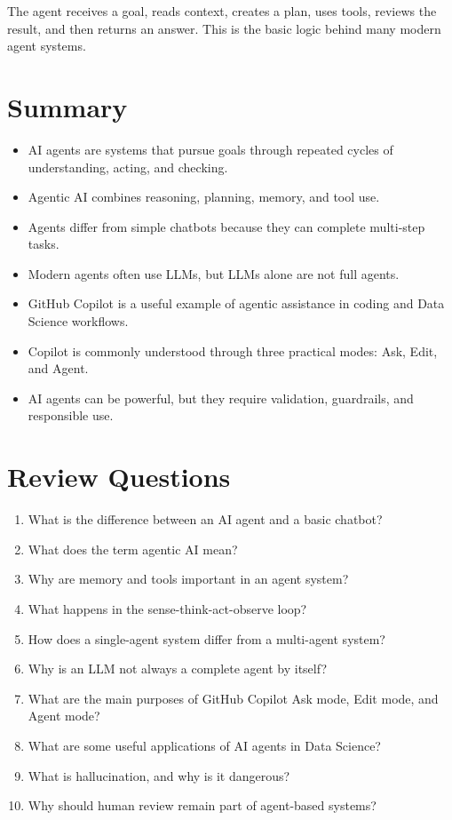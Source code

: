 \documentclass[11pt,a4paper]{article}
\begin{document}
\begin{conceptbox}
The agent receives a goal, reads context, creates a plan, uses tools, reviews the result, and then returns an answer. This is the basic logic behind many modern agent systems.
\end{conceptbox}

\section{Summary}

\begin{itemize}[leftmargin=*]
  \item AI agents are systems that pursue goals through repeated cycles of understanding, acting, and checking.
  \item Agentic AI combines reasoning, planning, memory, and tool use.
  \item Agents differ from simple chatbots because they can complete multi-step tasks.
  \item Modern agents often use LLMs, but LLMs alone are not full agents.
  \item GitHub Copilot is a useful example of agentic assistance in coding and Data Science workflows.
  \item Copilot is commonly understood through three practical modes: Ask, Edit, and Agent.
  \item AI agents can be powerful, but they require validation, guardrails, and responsible use.
\end{itemize}

\section{Review Questions}

\begin{enumerate}[leftmargin=*]
  \item What is the difference between an AI agent and a basic chatbot?
  \item What does the term agentic AI mean?
  \item Why are memory and tools important in an agent system?
  \item What happens in the sense-think-act-observe loop?
  \item How does a single-agent system differ from a multi-agent system?
  \item Why is an LLM not always a complete agent by itself?
  \item What are the main purposes of GitHub Copilot Ask mode, Edit mode, and Agent mode?
  \item What are some useful applications of AI agents in Data Science?
  \item What is hallucination, and why is it dangerous?
  \item Why should human review remain part of agent-based systems?
\end{enumerate}
\end{document}
